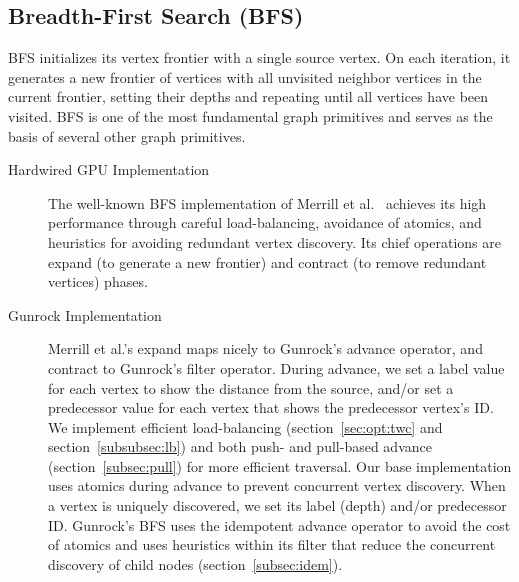 \documentclass[format=acmsmall,review=false,screen=true]{acmart}
\begin{document}
\subsection{Breadth-First Search (BFS)}

BFS initializes its vertex frontier with a single source vertex. On
each iteration, it generates a new frontier of vertices with all
unvisited neighbor vertices in the current frontier, setting their
depths and repeating until all vertices have been visited. BFS is one
of the most fundamental graph primitives and serves as the basis of
several other graph primitives.

\begin{description}

\item[Hardwired GPU Implementation] The well-known BFS implementation
  of Merrill et al.~\cite{Merrill:2012:SGG} achieves its high
  performance through careful load-balancing, avoidance of atomics,
  and heuristics for avoiding redundant vertex discovery. Its chief
  operations are expand (to generate a new frontier) and contract (to
  remove redundant vertices) phases.

\item[Gunrock Implementation] Merrill et al.'s expand maps nicely to
  Gunrock's advance operator, and contract to Gunrock's filter
  operator. During advance, we set a label value for each vertex to
  show the distance from the source, and/or set a predecessor value
  for each vertex that shows the predecessor vertex's ID\@. We
  implement efficient load-balancing (section~\ref{sec:opt:twc} and
  section~\ref{subsubsec:lb}) and both push- and pull-based advance
  (section~\ref{subsec:pull}) for more efficient traversal. Our base
  implementation uses atomics during advance to prevent concurrent
  vertex discovery. When a vertex is uniquely discovered, we set its
  label (depth) and/or predecessor ID\@. Gunrock's BFS uses the
  idempotent advance operator to avoid the cost of atomics and uses
  heuristics within its filter that reduce the concurrent discovery of
  child nodes (section~\ref{subsec:idem}).

\end{description}

\begin{comment}
  With these optimizations, we are able to increase the performance of
  BFS even more in Gunrock while significantly reducing the code size
  users have to write. Currently on graphs with large diameter,
  Gunrock's performance is 50\% of Merrill et al.'s BFS
  implementation. One reason is that in their BFS implementation, the
  highest performing strategy uses kernel fusion to merge their expand
  and contract kernels into one kernel, which significantly reduces
  data movement within one iteration. Gunrock's implementation does
  not include such optimization now, but we intend to implement a
  general kernel fusion strategy to integrate into our current
  traversal-compute abstraction.
\end{comment}
\end{document}
